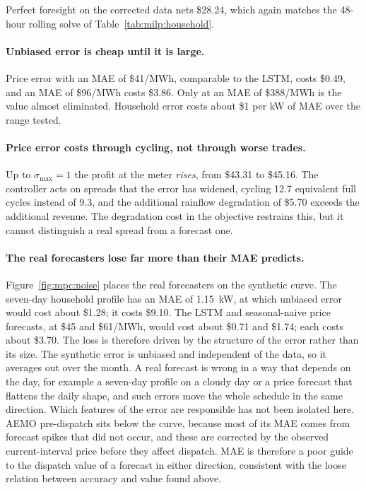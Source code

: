Perfect foresight on the corrected data nets \$28.24, which again matches the 48-hour
rolling solve of Table~\ref{tab:milp:household}.

\paragraph{Unbiased error is cheap until it is large.}
Price error with an MAE of \$41/MWh, comparable to the LSTM, costs \$0.49, and an MAE
of \$96/MWh costs \$3.86. Only at an MAE of \$388/MWh is the value almost eliminated.
Household error costs about \$1 per kW of MAE over the range tested.

\paragraph{Price error costs through cycling, not through worse trades.}
Up to $\sigma_{\max} = 1$ the profit at the meter \emph{rises}, from \$43.31 to
\$45.16. The controller acts on spreads that the error has widened, cycling 12.7
equivalent full cycles instead of 9.3, and the additional rainflow degradation of
\$5.70 exceeds the additional revenue. The degradation cost in the objective restrains
this, but it cannot distinguish a real spread from a forecast one.

\paragraph{The real forecasters lose far more than their MAE predicts.}
Figure~\ref{fig:mpc:noise} places the real forecasters on the synthetic curve. The
seven-day household profile has an MAE of 1.15~kW, at which unbiased error would cost
about \$1.28; it costs \$9.10. The LSTM and seasonal-naive price forecasts, at \$45 and
\$61/MWh, would cost about \$0.71 and \$1.74; each costs about \$3.70. The loss is
therefore driven by the structure of the error rather than its size. The synthetic error
is unbiased and independent of the data, so it averages out over the month. A real
forecast is wrong in a way that depends on the day, for example a seven-day profile on a
cloudy day or a price forecast that flattens the daily shape, and such errors move the
whole schedule in the same direction. Which features of the error are responsible has
not been isolated here. AEMO
pre-dispatch sits below the curve, because most of its MAE comes from forecast spikes
that did not occur, and these are corrected by the observed current-interval price
before they affect dispatch. MAE is therefore a poor guide to the dispatch value of a
forecast in either direction, consistent with the loose relation between accuracy and
value found above.

